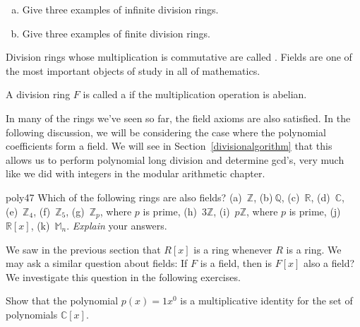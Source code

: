 \begin{exercise}{}
\begin{enumerate}[(a)]
\item
Give three examples of infinite division rings.
\item
Give three examples of finite division rings.
\end{enumerate}
\end{exercise}

Division rings whose multiplication is commutative are called .  Fields are one of the most important objects of study in all of mathematics.

\begin{defn} \label{def:field}
A division ring $F$ is called a  if the multiplication operation is abelian. \end{defn}

In many of the rings we've seen so far, the field axioms are also satisfied. In the following discussion, we will be considering the case where the polynomial coefficients form a field. We will see in Section~\ref{divisionalgorithm} that this allows us to perform polynomial long division and determine gcd's, very much like we did with integers in the modular arithmetic chapter.

\begin{exercise}{poly47}
Which of the following rings are also fields?
(a)~$\mathbb{Z}$,  (b)$~\mathbb{Q}$,  (c)~$\mathbb{R}$,  (d)~$\mathbb{C}$,  (e)~$\mathbb{Z}_4$,  (f)~$\mathbb{Z}_5$,  (g)~$\mathbb{Z}_p$, where $p$ is prime, (h)~$3\mathbb{Z}$,    (i)~$p\mathbb{Z}$, where $p$ is prime, (j)~$\mathbb{R}[x]$,  (k)~$\mathbb{M}_n$. \emph{Explain} your answers.\end{exercise}


We saw in the previous section that  $R[x]$ is a ring whenever $R$ is a ring. We may ask a similar question about fields: If $F$ is a field, then is $F[x]$ also a field? We investigate this question in the following exercises.


\begin{exercise}{}
Show that the polynomial $p(x) = 1x^0$ is a multiplicative identity for the set of polynomials $\mathbb{C}[x]$.
\end{exercise}

